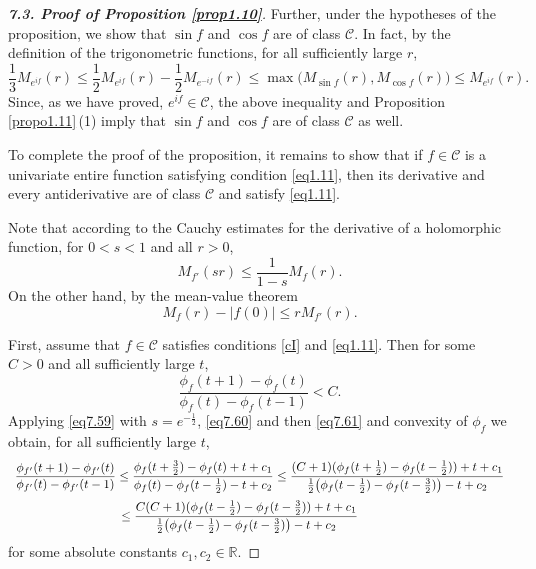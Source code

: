 \documentclass[11pt, oneside]{amsart}
\begin{document}
\begin{proof}[{\bf 7.3. Proof of Proposition \ref{prop1.10}}]
Further, under the hypotheses of the proposition, we show that $\sin f$ and $\cos f$ are of class $\mathscr C$. In fact,
by the definition of the trigonometric functions, for all sufficiently large $r$,
\[
\frac 13 M_{e^{if}}(r)\le\frac{1}{2} M_{e^{if}}(r)-\frac 12 M_{e^{-if}}(r)\le \max\bigl(M_{\sin f}(r),M_{\cos f}(r)\bigr)\le M_{e^{if}}(r).
\]
Since, as we have proved, $e^{if}\in\mathscr C$, the above inequality and Proposition \ref{propo1.11}\,(1) imply that $\sin f$ and $\cos f$ are of class $\mathscr C$ as well.

To complete the proof of the proposition, it remains to show that if $f\in\mathscr C$ is a univariate entire function satisfying condition \eqref{eq1.11}, then its derivative and every antiderivative are of class $\mathscr C$ and satisfy \eqref{eq1.11}.

Note that according to the Cauchy estimates for the derivative of a holomorphic function, for $0<s<1$ and all $r>0$,
\begin{equation}\label{eq7.59}
M_{f'}(sr)\le \frac{1}{1-s}M_f(r).
\end{equation}
On the other hand, by the mean-value theorem
\begin{equation}\label{eq7.60}
M_f(r)-|f(0)|\le r M_{f'}(r).
\end{equation}

First, assume that $f\in\mathscr C$ satisfies conditions \eqref{cI} and \eqref{eq1.11}. Then for some $C>0$ and all sufficiently large $t$,
\begin{equation}\label{eq7.61}
\frac{\phi_f(t+1)-\phi_f(t)}{\phi_f(t)-\phi_f(t-1)}<C.
\end{equation}
Applying \eqref{eq7.59} with $s=e^{-\frac 12}$, \eqref{eq7.60} and then \eqref{eq7.61} and convexity of $\phi_f$ we obtain, for all sufficiently large $t$,\smallskip
\begin{equation}\label{eq7.62}
\begin{array}{l}
\displaystyle
\frac{\phi_{f'}(t+1)-\phi_{f'}(t)}{\phi_{f'}(t)-\phi_{f'}(t-1)}\le \frac{\phi_f(t+\frac 32)-\phi_f(t)+t+ c_1}{\phi_f(t)-\phi_f(t-\frac 12)-t+c_2} \le\frac{(C+1)(\phi_f(t+\frac 12)-\phi_f(t-\frac 12))+t+ c_1}{\frac{1}{2}\bigl(\phi_f(t-\frac 12)-\phi_f(t-\frac 32)\bigr)-t+c_2}\medskip\\
\displaystyle\qquad\qquad\qquad\qquad\ \
\le\frac{C(C+1)(\phi_f(t-\frac 12)-\phi_f(t-\frac 32))+t+ c_1}{
\frac{1}{2}\bigl(\phi_f(t-\frac 12)-\phi_f(t-\frac 32)\bigr)-t+c_2}
\end{array}
\end{equation}
for some absolute constants $c_1,c_2\in\mathbb R$.


\end{proof}
\end{document}
